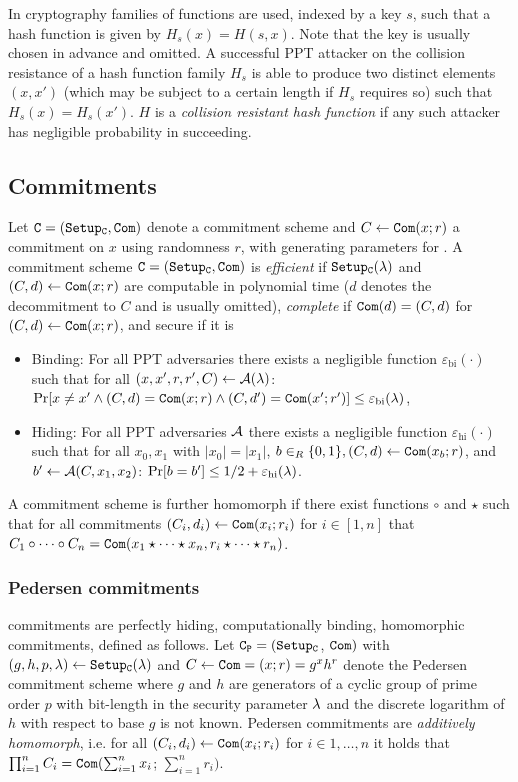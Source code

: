 In cryptography families of functions are used, indexed by a key $s$, such that a hash function is given by $H_s(x)=H(s, x)$.
Note that the key is usually chosen in advance and omitted.
A successful \ac{PPT} attacker on the collision resistance of a hash function family $H_s$ is able to produce two distinct elements $(x,x')$ (which may be subject to a certain length if $H_s$ requires so) such that $H_s(x)=H_s(x')$.
$H$ is a \emph{collision resistant hash function} if any such attacker has negligible probability in succeeding.


\subsection{Commitments} \label{sec:commitments}
Let $\mathtt{C}=(\mathtt{Setup_C},\mathtt{Com})$ denote a commitment scheme and $C\gets\mathtt{Com}(x;r)$ a commitment on $x$ using randomness $r$, with \SetupC generating parameters for \Commitment.
A commitment scheme $\mathtt{C}=(\mathtt{Setup_C},\mathtt{Com})$ is \emph{efficient} if $\mathtt{Setup_C}(\lambda)$ and $(C,d)\gets\mathtt{Com}(x;r)$ are computable in polynomial time ($d$ denotes the decommitment to $C$ and is usually omitted), \emph{complete} if $\mathtt{Com}(d)=(C,d)$ for $(C,d)\gets\mathtt{Com}(x;r)$, and secure if it is
\begin{itemize}
  \item Binding: For all PPT adversaries \cA there exists a negligible function $\varepsilon_{\mathrm{bi}}(\cdot)$ such that for all $(x,x',r,r',C)\gets \mathcal{A}(\lambda)$:
    $\Pr[x\not=x'\wedge (C,d)=\mathtt{Com}(x;r)\wedge (C,d')=\mathtt{Com}(x';r')] \leq \varepsilon_{\mathrm{bi}}(\lambda)$,
  \item Hiding: For all PPT adversaries $\mathcal{A}$ there exists a negligible function $\varepsilon_{\mathrm{hi}}(\cdot)$ such that for all $x_0,x_1$ with $|x_0|=|x_1|$, $b\in_R\{0,1\}, (C,d)\gets\mathtt{Com}(x_b;r)$, and $b'\gets \mathcal{A}(C,x_1,x_2)$:
    $\Pr[b=b'] \leq 1/2+\varepsilon_{\mathrm{hi}}(\lambda)$.
\end{itemize}

\noindent
A commitment scheme is further homomorph if there exist functions $\circ$ and $\star$ such that for all commitments $(C_i,d_i)\gets\mathtt{Com}(x_i;r_i)$  for $i\in[1,n]$ that $C_1 \circ \cdots \circ C_n = \mathtt{Com}(x_1\star \cdots \star x_n, r_i\star \cdots \star r_n)$.

\subsubsection{Pedersen commitments}
\citet{Pedersen91} commitments are perfectly hiding, computationally binding, homomorphic commitments, defined as follows.
Let $\mathtt{C_P}=(\mathtt{Setup_C}$, $\mathtt{Com})$ with $(g,h,p,\lambda)\gets\mathtt{Setup_C}(\lambda)$ and $C\gets\mathtt{Com}=(x;r)=g^x h^r$ denote the Pedersen commitment scheme where $g$ and $h$ are generators of a cyclic group \GG of prime order $p$ with bit-length in the security parameter $\lambda$ and the discrete logarithm of $h$ with respect to base $g$ is not known.
Pedersen commitments are \emph{additively homomorph}, i.e. for all $(C_i,d_i) \gets \mathtt{Com}(x_i;r_i)$ for $i\in 1,\dots,n$ it holds that $\prod_{i=1}^{n}C_i=\mathtt{Com}(\sum_{i=1}^{n}x_i$; $\sum_{i=1}^{n}r_i)$.

